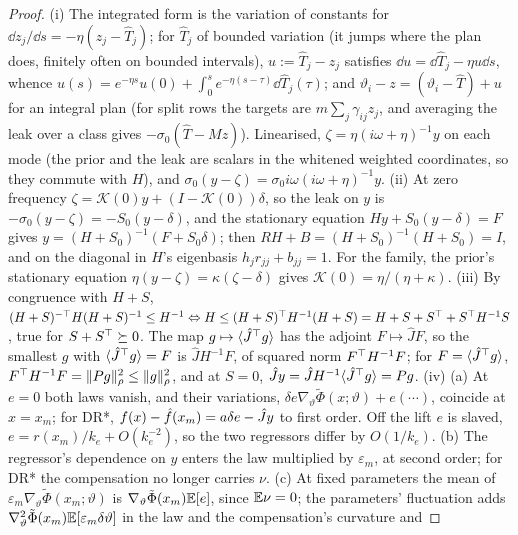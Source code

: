 \begin{proof}
(i) The integrated form is the variation of constants for $\dd z_j/\dd s = -\eta(z_j - \hat T_j)$; for $\hat T_j$ of
bounded variation (it jumps where the plan does, finitely often on bounded intervals), $u := \hat T_j - z_j$ satisfies
$\dd u = \dd\hat T_j - \eta u\dd s$, whence $u(s) = e^{-\eta s}u(0) + \int_0^se^{-\eta(s-\tau)}\dd\hat T_j(\tau)$; and
$\vartheta_i - z = (\vartheta_i - \hat T) + u$ for an integral plan (for split rows the targets are
$m\sum_j\gamma_{ij}z_j$, and averaging the leak over a class gives $-\sigma_0(\hat T - Mz)$). Linearised,
$\zeta = \eta(i\omega + \eta)^{-1}y$ on each mode (the prior and the leak are scalars in the whitened weighted
coordinates, so they commute with $H$), and $\sigma_0(y - \zeta) = \sigma_0i\omega(i\omega + \eta)^{-1}y$. (ii) At
zero frequency $\zeta = \mathcal{K}(0)y + (I - \mathcal{K}(0))\delta$, so the leak on $y$ is
$-\sigma_0(y - \zeta) = -S_0(y - \delta)$, and the stationary equation $Hy + S_0(y - \delta) = F$ gives
$y = (H + S_0)^{-1}(F + S_0\delta)$; then $RH + B = (H + S_0)^{-1}(H + S_0) = I$, and on the diagonal in $H$'s
eigenbasis $h_jr_{jj} + b_{jj} = 1$. For the family, the prior's stationary equation
$\eta(y - \zeta) = \kappa(\zeta - \delta)$ gives $\mathcal{K}(0) = \eta/(\eta + \kappa)$. (iii) By congruence with
$H + S$, $(H + S)^{-\top}H(H + S)^{-1}\le H^{-1}\Leftrightarrow H\le(H + S)^\top H^{-1}(H + S)
= H + S + S^\top + S^\top H^{-1}S$, true for $S + S^\top\succeq0$. The map $g\mapsto\langle\hat J^\top g\rangle$ has the
adjoint $F\mapsto\hat JF$, so the smallest $g$ with $\langle\hat J^\top g\rangle = F$ is $\hat JH^{-1}F$, of squared norm
$F^\top H^{-1}F$; for $F = \langle\hat J^\top g\rangle$, $F^\top H^{-1}F = \lVert Pg\rVert^2_\rho\le\lVert g\rVert^2_\rho$, and at
$S = 0$, $\hat Jy = \hat JH^{-1}\langle\hat J^\top g\rangle = Pg$. (iv) (a) At $e = 0$ both laws vanish, and their
variations, $\delta e\nabla_\vartheta\tilde\Phi(x;\vartheta) + e(\cdots)$, coincide at $x = x_m$; for DR*,
$f(x) - \hat f(x_m) = a\delta e - \hat Jy$ to first order. Off the lift $e$ is slaved,
$e = r(x_m)/k_e + O(k_e^{-2})$, so the two regressors differ by $O(1/k_e)$. (b) The regressor's dependence on $y$
enters the law multiplied by $\varepsilon_m$, at second order; for DR* the compensation no longer carries $\nu$. (c) At
fixed parameters the mean of $\varepsilon_m\nabla_\vartheta\tilde\Phi(x_m;\vartheta)$ is
$\nabla_\vartheta\tilde\Phi(x_m)\mathbb{E}[e]$, since $\mathbb{E}\nu = 0$; the parameters' fluctuation adds
$\nabla^2_\vartheta\tilde\Phi(x_m)\mathbb{E}[\varepsilon_m\delta\vartheta]$ in the law and the compensation's curvature and

\end{proof}
